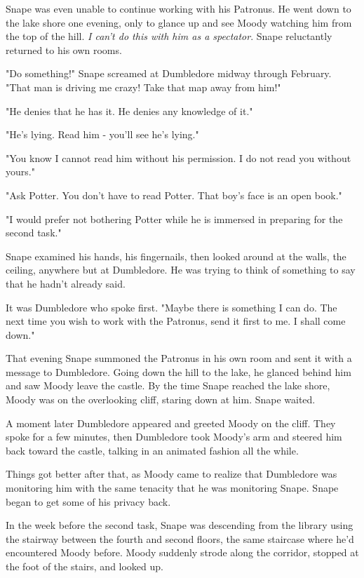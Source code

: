 Snape was even unable to continue working with his Patronus. He went down to the lake shore one evening, only to glance up and see Moody watching him from the top of the hill. \emph{I can't do this with him as a spectator}. Snape reluctantly returned to his own rooms.

"Do something!" Snape screamed at Dumbledore midway through February. "That man is driving me crazy! Take that map away from him!"

"He denies that he has it. He denies any knowledge of it."

"He's lying. Read him - you'll see he's lying."

"You know I cannot read him without his permission. I do not read you without yours."

"Ask Potter. You don't have to read Potter. That boy's face is an open book."

"I would prefer not bothering Potter while he is immersed in preparing for the second task."

Snape examined his hands, his fingernails, then looked around at the walls, the ceiling, anywhere but at Dumbledore. He was trying to think of something to say that he hadn't already said.

It was Dumbledore who spoke first. "Maybe there is something I can do. The next time you wish to work with the Patronus, send it first to me. I shall come down."

That evening Snape summoned the Patronus in his own room and sent it with a message to Dumbledore. Going down the hill to the lake, he glanced behind him and saw Moody leave the castle. By the time Snape reached the lake shore, Moody was on the overlooking cliff, staring down at him. Snape waited.

A moment later Dumbledore appeared and greeted Moody on the cliff. They spoke for a few minutes, then Dumbledore took Moody's arm and steered him back toward the castle, talking in an animated fashion all the while.

Things got better after that, as Moody came to realize that Dumbledore was monitoring him with the same tenacity that he was monitoring Snape. Snape began to get some of his privacy back.

In the week before the second task, Snape was descending from the library using the stairway between the fourth and second floors, the same staircase where he'd encountered Moody before. Moody suddenly strode along the corridor, stopped at the foot of the stairs, and looked up.

